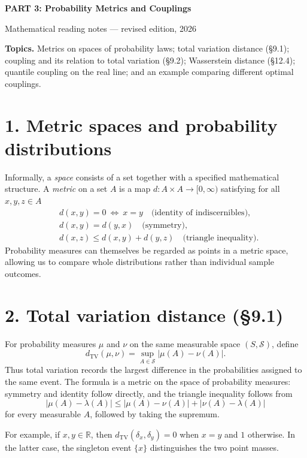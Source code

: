 \documentclass[10pt,a4paper]{article}
\newcommand{\R}{\mathbb R}\newcommand{\E}{\mathbb E}\newcommand{\N}{\mathbb N}
\newcommand{\TV}{d_{\mathrm{TV}}}
\begin{document}
\begin{center}
{\Large\bfseries PART 3: Probability Metrics and Couplings}\par
{\normalsize Mathematical reading notes --- revised edition, 2026}
\end{center}
\vspace{8pt}
\textbf{Topics.} Metrics on spaces of probability laws; total variation distance (\S9.1); coupling and its relation to total variation (\S9.2); Wasserstein distance (\S12.4); quantile coupling on the real line; and an example comparing different optimal couplings.

\section*{1. Metric spaces and probability distributions}
Informally, a \emph{space} consists of a set together with a specified mathematical structure. A \emph{metric} on a set $A$ is a map $d:A\times A\to[0,\infty)$ satisfying for all $x,y,z\in A$
\begin{align*}
&d(x,y)=0\ \Longleftrightarrow\ x=y \quad\text{(identity of indiscernibles)},\\
&d(x,y)=d(y,x) \quad\text{(symmetry)},\\
&d(x,z)\le d(x,y)+d(y,z)\quad\text{(triangle inequality)}.
\end{align*}
Probability measures can themselves be regarded as points in a metric space, allowing us to compare whole distributions rather than individual sample outcomes.

\section*{2. Total variation distance (\S9.1)}
For probability measures $\mu$ and $\nu$ on the same measurable space $(S,\mathcal S)$, define
\[
\TV(\mu,\nu)=\sup_{A\in\mathcal S}|\mu(A)-\nu(A)|.
\]
Thus total variation records the largest difference in the probabilities assigned to the same event. The formula is a metric on the space of probability measures: symmetry and identity follow directly, and the triangle inequality follows from
\[
|\mu(A)-\lambda(A)|\le|\mu(A)-\nu(A)|+|\nu(A)-\lambda(A)|
\]
for every measurable $A$, followed by taking the supremum.

For example, if $x,y\in\R$, then $\TV(\delta_x,\delta_y)=0$ when $x=y$ and $1$ otherwise. In the latter case, the singleton event $\{x\}$ distinguishes the two point masses.
\end{document}
